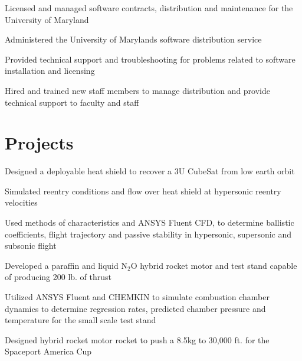 \documentclass[letterpaper,11pt]{cv_format}
\begin{document}
\begin{c_itemize}
    \item Licensed and managed software contracts, distribution and maintenance for the University of Maryland
    \item Administered the University of Marylands software distribution service
    \item Provided technical support and troubleshooting for problems related to software installation and licensing 
    \item Hired and trained new staff members to manage distribution and provide technical support to faculty and staff

\end{c_itemize}


\section{Projects}
\begin{c_itemize}
    \item Designed a deployable heat shield to recover a 3U CubeSat from low earth orbit
    \item Simulated reentry conditions and flow over heat shield at hypersonic reentry velocities
    \item Used methods of characteristics and ANSYS Fluent CFD, to determine ballistic coefficients, flight trajectory and passive stability in hypersonic, supersonic and subsonic flight
\end{c_itemize}

\begin{c_itemize}
    \item Developed a paraffin and liquid N$_2$O hybrid rocket motor and test stand capable of producing 200 lb. of thrust
    \item Utilized ANSYS Fluent and CHEMKIN to simulate combustion chamber dynamics to determine regression rates, predicted chamber pressure and temperature for the small scale test stand
    \item Designed hybrid rocket motor rocket to push a 8.5kg to 30,000 ft. for the Spaceport America Cup
\end{c_itemize}
\end{document}
